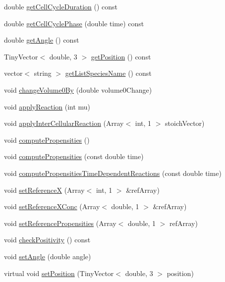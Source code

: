 \begin{DoxyCompactItemize}
\item 
double \hyperlink{class_cell_base_aebfee0ab9fcf545450f015019ed228ce}{get\-Cell\-Cycle\-Duration} () const 
\item 
double \hyperlink{class_cell_base_aa37b1fc8ce2ca9cea42d647e7b320508}{get\-Cell\-Cycle\-Phase} (double time) const 
\item 
double \hyperlink{class_cell_base_a3fb7f0f49934e83a0ed1cd2d82fba99e}{get\-Angle} () const 
\item 
\-Tiny\-Vector$<$ double, 3 $>$ \hyperlink{class_cell_base_a32874d1193fa5b7a7fe7ccc3c1cfda98}{get\-Position} () const 
\item 
vector$<$ string $>$ \hyperlink{class_cell_base_ae8abd7753ef0e29bc858a35574554085}{get\-List\-Species\-Name} () const 
\item 
void \hyperlink{class_cell_base_ad67a9e2a335b88e788a6fb59fb1ee93a}{change\-Volume0\-By} (double volume0\-Change)
\item 
void \hyperlink{class_cell_base_ae24860242d26c1eff241af04daaf06a0}{apply\-Reaction} (int mu)
\item 
void \hyperlink{class_cell_base_a64655783b5cffb637ae4dd41403942e3}{apply\-Inter\-Cellular\-Reaction} (\-Array$<$ int, 1 $>$ stoich\-Vector)
\item 
void \hyperlink{class_cell_base_a36d16b84e0291e317fcf2425bbd6a953}{compute\-Propensities} ()
\item 
void \hyperlink{class_cell_base_a17dcaf6ab4ce71d41640de772822ea79}{compute\-Propensities} (const double time)
\item 
void \hyperlink{class_cell_base_a00a0fa8efa67c71ca357458f7f29a8c8}{compute\-Propensities\-Time\-Dependent\-Reactions} (const double time)
\item 
void \hyperlink{class_cell_base_aee22c1932b129c07afaf7f6ecac79d9b}{set\-Reference\-X} (\-Array$<$ int, 1 $>$ \&ref\-Array)
\item 
void \hyperlink{class_cell_base_a3337e4c5aa43f7fe166dc19df4142510}{set\-Reference\-X\-Conc} (\-Array$<$ double, 1 $>$ \&ref\-Array)
\item 
void \hyperlink{class_cell_base_afd447b811d2bacc971aba82447a8123e}{set\-Reference\-Propensities} (\-Array$<$ double, 1 $>$ ref\-Array)
\item 
void \hyperlink{class_cell_base_a3d2b95cda02a4fd4b2b33dd38e1e9817}{check\-Positivity} () const 
\item 
void \hyperlink{class_cell_base_a8ab82721972f41f1d233ab17a841580c}{set\-Angle} (double angle)
\item 
virtual void \hyperlink{class_cell_base_a913046f5a53f8960f5c17252df6056df}{set\-Position} (\-Tiny\-Vector$<$ double, 3 $>$ position)
\end{DoxyCompactItemize}
